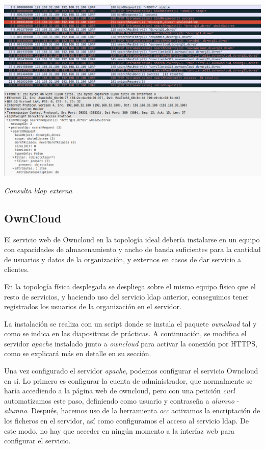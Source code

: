 \documentclass[]{article}
\begin{document}
\begin{center}
	\includegraphics[scale=0.45]{images/ldap/ldap7}
	
	\textit{Consulta ldap externa}
\end{center}





\subsection{OwnCloud}

El servicio web de Owncloud en la topología ideal debería instalarse en un equipo con capacidades de almacenamiento y ancho de banda suficientes para la cantidad de usuarios y datos de la organización, y externos en casos de dar servicio a clientes.

En la topología física desplegada se despliega sobre el mismo equipo físico que el resto de servicios, y haciendo uso del servicio ldap anterior, conseguimos tener registrados los usuarios de la organización en el servidor.

La instalación se realiza con un script donde se instala el paquete \textit{owncloud} tal y como se indica en las diapositivas de prácticas. A continuación, se modifica el servidor \textit{apache} instalado junto a \textit{owncloud} para activar la conexión por HTTPS, como se explicará más en detalle en su sección.

Una vez configurado el servidor \textit{apache}, podemos configurar el servicio Owncloud en sí. Lo primero es configurar la cuenta de administrador, que normalmente se haría accediendo a la página web de owncloud, pero con una petición \textit{curl} automatizamos este paso, definiendo como usuario y contraseña a \textit{alumno} - \textit{alumno}. Después, hacemos uso de la herramienta \textit{occ} activamos la encriptación de los ficheros en el servidor, así como configuramos el acceso al servicio ldap. De este modo, no hay que acceder en ningún momento a la interfaz web para configurar el servicio.
\end{document}

